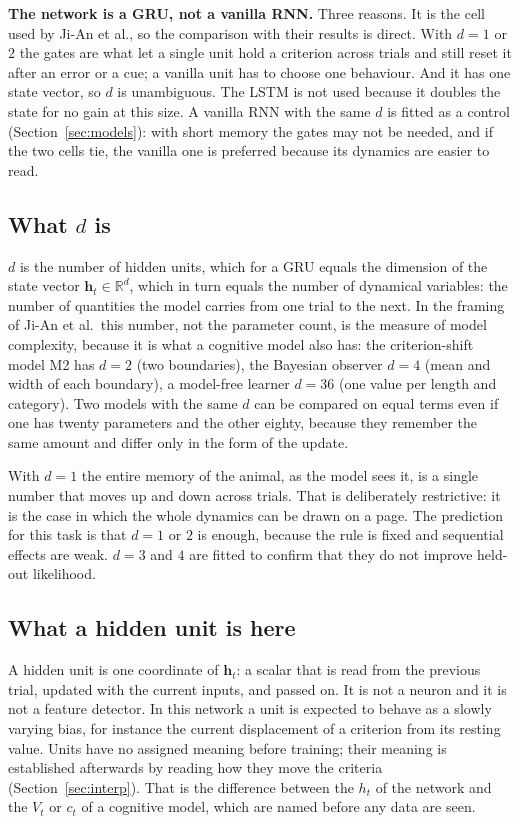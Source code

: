 \documentclass[11pt,a4paper]{article}
\newcommand{\vect}[1]{\bm{#1}}
\begin{document}
\textbf{The network is a GRU, not a vanilla RNN.} Three reasons. It is the cell used by
Ji-An et al., so the comparison with their results is direct. With $d = 1$ or $2$ the
gates are what let a single unit hold a criterion across trials and still reset it after
an error or a cue; a vanilla unit has to choose one behaviour. And it has one state
vector, so $d$ is unambiguous. The LSTM is not used because it doubles the state for no
gain at this size. A vanilla RNN with the same $d$ is fitted as a control
(Section~\ref{sec:models}): with short memory the gates may not be needed, and if the
two cells tie, the vanilla one is preferred because its dynamics are easier to read.

\subsection{What $d$ is}

$d$ is the number of hidden units, which for a GRU equals the dimension of the state
vector $\vect{h}_t \in \mathbb{R}^d$, which in turn equals the number of dynamical
variables: the number of quantities the model carries from one trial to the next. In the
framing of Ji-An et al.\ this number, not the parameter count, is the measure of model
complexity, because it is what a cognitive model also has: the criterion-shift model M2
has $d = 2$ (two boundaries), the Bayesian observer $d = 4$ (mean and width of each
boundary), a model-free learner $d = 36$ (one value per length and category). Two models
with the same $d$ can be compared on equal terms even if one has twenty parameters and
the other eighty, because they remember the same amount and differ only in the form of
the update.

With $d = 1$ the entire memory of the animal, as the model sees it, is a single number
that moves up and down across trials. That is deliberately restrictive: it is the case in
which the whole dynamics can be drawn on a page. The prediction for this task is that
$d = 1$ or $2$ is enough, because the rule is fixed and sequential effects are weak.
$d = 3$ and $4$ are fitted to confirm that they do not improve held-out likelihood.

\subsection{What a hidden unit is here}

A hidden unit is one coordinate of $\vect{h}_t$: a scalar that is read from the previous
trial, updated with the current inputs, and passed on. It is not a neuron and it is not
a feature detector. In this network a unit is expected to behave as a slowly varying
bias, for instance the current displacement of a criterion from its resting value.
Units have no assigned meaning before training; their meaning is established afterwards
by reading how they move the criteria (Section~\ref{sec:interp}). That is the difference
between the $h_t$ of the network and the $V_t$ or $c_t$ of a cognitive model, which are
named before any data are seen.
\end{document}
